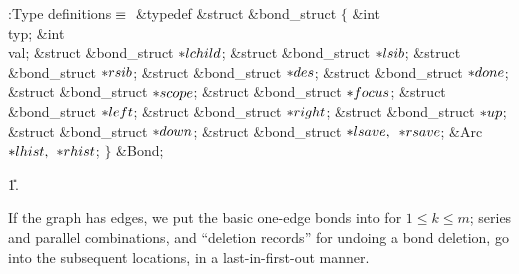 \Y\B\4:Type definitions\X${}\equiv{}$\6
\&{typedef} \&{struct} \&{bond\_struct} ${}\{{}$\1\6
\&{int} \\{typ};\6
\&{int} \\{val};\6
\&{struct} \&{bond\_struct} ${}{*}\\{lchild}{}$;\6
\&{struct} \&{bond\_struct} ${}{*}\\{lsib}{}$;\6
\&{struct} \&{bond\_struct} ${}{*}\\{rsib}{}$;\6
\&{struct} \&{bond\_struct} ${}{*}\\{des}{}$;\6
\&{struct} \&{bond\_struct} ${}{*}\\{done}{}$;\6
\&{struct} \&{bond\_struct} ${}{*}\\{scope}{}$;\6
\&{struct} \&{bond\_struct} ${}{*}\\{focus}{}$;\6
\&{struct} \&{bond\_struct} ${}{*}\\{left}{}$;\6
\&{struct} \&{bond\_struct} ${}{*}\\{right}{}$;\6
\&{struct} \&{bond\_struct} ${}{*}\\{up}{}$;\6
\&{struct} \&{bond\_struct} ${}{*}\\{down}{}$;\6
\&{struct} \&{bond\_struct} ${}{*}\\{lsave},{}$ ${}{*}\\{rsave}{}$;\6
\&{Arc} ${}{*}\\{lhist},{}$ ${}{*}\\{rhist}{}$;\2\6
${}\}{}$ \&{Bond};\par
\U1.\fi

If the graph has  edges, we put the basic one-edge bonds into
 for $1\le k\le m$; series and parallel combinations,
and ``deletion records'' for undoing a bond deletion, go into the
subsequent locations, in a last-in-first-out manner.

